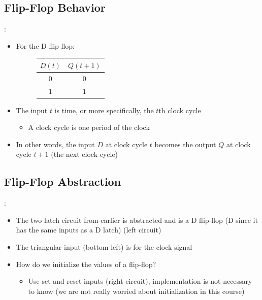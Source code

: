 \documentclass{../slides}
\begin{document}
\subsection{Flip-Flop Behavior}
\begin{frame}{\secname: \subsecname}
    \begin{itemize}
        \item For the D flip-flop:
        \begin{figure}[H]
            \centering
            \begin{tabular}{c|c}
                $D(t)$ & $Q(t + 1)$\\\hline
                $0$ & $0$ \\
                $1$ & $1$
            \end{tabular}
        \end{figure}
        \item The input $t$ is time, or more specifically, the $t$th clock cycle
        \begin{itemize}
            \item A clock cycle is one period of the clock
        \end{itemize}
        \item In other words, the input $D$ at clock cycle $t$ becomes the output $Q$ at clock cycle $t+1$ (the next clock cycle)
    \end{itemize}
\end{frame}

\subsection{Flip-Flop Abstraction}
\begin{frame}{\secname: \subsecname}
    \begin{itemize}
        \item The two latch circuit from earlier is abstracted and is a D flip-flop (D since it has the same inputs as a D latch) (left circuit)
        \begin{figure}[H]
            \centering
        \end{figure}
        \item The triangular input (bottom left) is for the clock signal
        \item How do we initialize the values of a flip-flop?
        \begin{itemize}
            \item Use set and reset inputs (right circuit), implementation is not necessary to know (we are not really worried about initialization in this course)
        \end{itemize}
    \end{itemize}
\end{frame}
\end{document}
